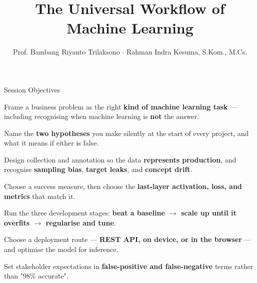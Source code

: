 \documentclass[aspectratio=169,11pt,t]{beamer}
\title{The Universal Workflow of Machine Learning}
\author{Prof. Bambang Riyanto Trilaksono $\cdot$ Rahman Indra Kesuma, S.Kom., M.Cs.}
\date{}
\begin{document}
\covertitle

\begin{frame}[shrink=25]{Session Objectives}
\begin{isteps}
\item Frame a business problem as the right \textbf{kind of machine learning task} --- including recognising when machine learning is \textbf{not} the answer.
\item Name the \textbf{two hypotheses} you make silently at the start of every project, and what it means if either is false.
\item Design collection and annotation so the data \textbf{represents production}, and recognise \textbf{sampling bias}, \textbf{target leaks}, and \textbf{concept drift}.
\item Choose a success measure, then choose the \textbf{last-layer activation, loss, and metrics} that match it.
\item Run the three development stages: \textbf{beat a baseline $\rightarrow$ scale up until it overfits $\rightarrow$ regularise and tune}.
\item Choose a deployment route --- \textbf{REST API, on device, or in the browser} --- and optimise the model for inference.
\item Set stakeholder expectations in \textbf{false-positive and false-negative} terms rather than "98\% accurate".
\end{isteps}

\vskip 6pt
\vskip 4pt
\vskip 2pt
\end{frame}
\end{document}
